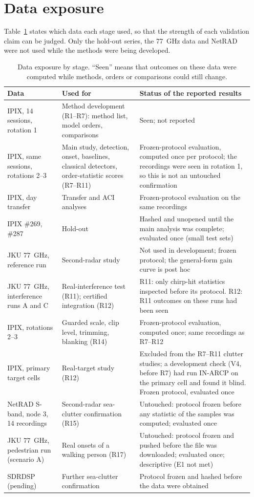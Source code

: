 \documentclass[10pt]{article}
\begin{document}
\section{Data exposure}
Table~\ref{tab:exposure} states which data each stage used, so that the strength of each validation claim can be judged. Only the hold-out series, the 77~GHz data and NetRAD were not used while the methods were being developed.
\begin{table}[h]
\centering\small
\caption{Data exposure by stage. ``Seen'' means that outcomes on these data were computed while methods, orders or comparisons could still change.}
\label{tab:exposure}
\begin{tabular}{p{4.3cm}p{5.2cm}p{6.2cm}}
\toprule
Data & Used for & Status of the reported results\\
\midrule
IPIX, 14 sessions, rotation 1 & Method development (R1--R7): method list, model orders, comparisons & Seen; not reported\\
IPIX, same sessions, rotations 2--3 & Main study, detection, onset, baselines, classical detectors, order-statistic scores (R7--R11) & Frozen-protocol evaluation, computed once per protocol; the recordings were seen in rotation 1, so this is not an untouched confirmation\\
IPIX, day transfer & Transfer and ACI analyses & Frozen-protocol evaluation on the same recordings\\
IPIX \#269, \#287 & Hold-out & Hashed and unopened until the main analysis was complete; evaluated once (small test sets)\\
JKU 77~GHz, reference run & Second-radar study & Not used in development; frozen protocol; the general-form gain curve is post hoc\\
JKU 77~GHz, interference runs A and C & Real-interference test (R11); certified integration (R12) & R11: only chirp-hit statistics inspected before its protocol. R12: R11 outcomes on these runs had been seen\\
IPIX, rotations 2--3 & Guarded scale, clip level, trimming, blanking (R14) & Frozen-protocol evaluation, computed once; same recordings as R7--R12\\
IPIX, primary target cells & Real-target study (R12) & Excluded from the R7--R11 clutter studies; a development check (V4, before R7) had run IN-ARCP on the primary cell and found it blind. Frozen protocol, evaluated once\\
NetRAD S-band, node 3, 14 recordings & Second-radar sea-clutter confirmation (R15) & Untouched: protocol frozen before any statistic of the samples was computed; evaluated once\\
JKU 77~GHz, pedestrian run (scenario A) & Real onsets of a walking person (R17) & Untouched: protocol frozen and pushed before the file was downloaded; evaluated once; descriptive (E1 not met)\\
SDRDSP (pending) & Further sea-clutter confirmation & Protocol frozen and hashed before the data were obtained\\
\bottomrule
\end{tabular}
\end{table}
\end{document}
